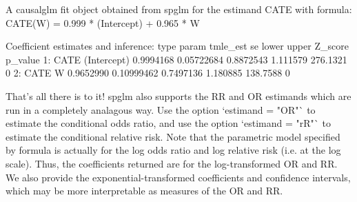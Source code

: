 \documentclass[article]{jss}
\begin{document}
\begin{Schunk}
\begin{Soutput}
A causalglm fit object obtained from spglm for the estimand CATE with formula: 
CATE(W) = 0.999 * (Intercept) + 0.965 * W

Coefficient estimates and inference:
   type       param  tmle_est         se     lower    upper  Z_score p_value
1: CATE (Intercept) 0.9994168 0.05722684 0.8872543 1.111579 276.1321       0
2: CATE           W 0.9652990 0.10999462 0.7497136 1.180885 138.7588       0
\end{Soutput}
\end{Schunk}



That's all there is to it! spglm also supports the RR and OR estimands which are run in a completely analagous way. Use the option `estimand = "OR"` to estimate the conditional odds ratio, and use the option `estimand = "rR"` to estimate the conditional relative risk. Note that the parametric model specified by formula is actually for the log odds ratio and log relative risk (i.e. at the log scale). Thus, the coefficients returned are for the log-transformed OR and RR. We also provide the exponential-transformed coefficients and confidence intervals, which may be more interpretable as measures of the OR and RR.
\end{document}
